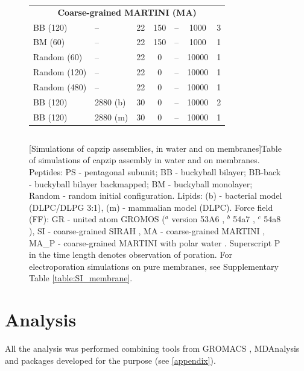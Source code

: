 \begin{figure}[p!]
\begin{tabular}{llccccc}
 \hline
\multicolumn{7}{c}{\textbf{Coarse-grained MARTINI (MA)}} \\
 BB (120) & -- & 22 & 150 & -- & 1000 & 3 \\
 BM (60) & -- & 22 & 150 & -- & 1000 & 1 \\
 Random (60) & -- & 22 & 0 & -- & 10000 & 1 \\
 Random (120) & -- & 22 & 0 & -- & 10000 & 1 \\
 Random (480) & -- & 22 & 0 & -- & 10000 & 1 \\
 BB (120) & 2880 (b) & 30 & 0 & -- & 10000 & 2 \\
 BB (120) & 2880 (m) & 30 & 0 & -- & 10000 & 1 \\
 \hline
 \end{tabular}
 \begin{tabular}{lcccccc}
 \hline
 \hline
\end{tabular}
\vspace{0.5cm}
[Simulations of capzip assemblies, in water and on membranes]{Table of simulations of capzip assembly in water and on membranes.
%
Peptides: PS - pentagonal subunit; BB - buckyball bilayer; BB-back - buckyball bilayer backmapped; BM - buckyball monolayer; Random - random initial configuration.
%
Lipids: (b) - bacterial model (DLPC/DLPG 3:1), (m) - mammalian model (DLPC).
%
Force field (FF): GR - united atom GROMOS ($^a$ version 53A6 \citep{Oostenbrink2004}, $^b$ 54a7 \citep{Schmid2011}, $^c$ 54a8 \citep{Reif2012}), SI - coarse-grained SIRAH \citep{Machado2018}, MA - coarse-grained MARTINI \citep{Marrink2007, Monticelli2008}, MA\_P - coarse-grained MARTINI with polar water \citep{Yesylevskyy2010}.
%
Superscript P in the time length denotes observation of poration.
%
For electroporation simulations on pure membranes, see Supplementary Table \ref{table:SI_membrane}.}
\label{table:sim_all}
\end{figure}

\section{Analysis} \label{sec:analysis}

All the analysis was performed combining tools from GROMACS \citep{Berendsen1995,Abraham2015,gromacs_man}, MDAnalysis \citep{Michaud-Agrawal2011,Gowers2016} and packages developed for the purpose (see \ref{appendix}).

